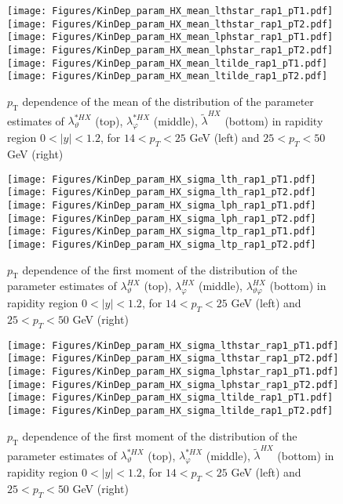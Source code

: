\documentclass[12pt]{article}
\newcommand{\pT}{p_\mathrm{T}}
\newcommand{\absy}{\left |  y \right |}
\newcommand{\lamthHX}{\lambda^{\scriptscriptstyle HX}_\vartheta}
\newcommand{\lamphHX}{\lambda^{\scriptscriptstyle HX}_\varphi}
\newcommand{\lamthphHX}{\lambda^{\scriptscriptstyle HX}_{\vartheta \varphi}}
\newcommand{\lamtildeHX}{\tilde{\lambda}^{\scriptscriptstyle HX}}
\newcommand{\lamthstarHX}{\lambda^{* \scriptscriptstyle HX}_\vartheta}
\newcommand{\lamphstarHX}{\lambda^{* \scriptscriptstyle HX}_\varphi}
\begin{document}
\begin{figure}[htbp]
\centering
\texttt{[image: Figures/KinDep\_param\_HX\_mean\_lthstar\_rap1\_pT1.pdf]}
\texttt{[image: Figures/KinDep\_param\_HX\_mean\_lthstar\_rap1\_pT2.pdf]}
\texttt{[image: Figures/KinDep\_param\_HX\_mean\_lphstar\_rap1\_pT1.pdf]}
\texttt{[image: Figures/KinDep\_param\_HX\_mean\_lphstar\_rap1\_pT2.pdf]}
\texttt{[image: Figures/KinDep\_param\_HX\_mean\_ltilde\_rap1\_pT1.pdf]}
\texttt{[image: Figures/KinDep\_param\_HX\_mean\_ltilde\_rap1\_pT2.pdf]}
\caption{$\pT$ dependence of the mean of the distribution of the parameter estimates of $\lamthstarHX$ (top), $\lamphstarHX$ (middle), $\lamtildeHX$ (bottom) in rapidity region $0<\absy<1.2$, for $14 < p_T < 25$ GeV (left) and
$25 < p_T < 50$ GeV (right)}
\end{figure}
\clearpage


\begin{figure}[htbp]
\centering
\texttt{[image: Figures/KinDep\_param\_HX\_sigma\_lth\_rap1\_pT1.pdf]}
\texttt{[image: Figures/KinDep\_param\_HX\_sigma\_lth\_rap1\_pT2.pdf]}
\texttt{[image: Figures/KinDep\_param\_HX\_sigma\_lph\_rap1\_pT1.pdf]}
\texttt{[image: Figures/KinDep\_param\_HX\_sigma\_lph\_rap1\_pT2.pdf]}
\texttt{[image: Figures/KinDep\_param\_HX\_sigma\_ltp\_rap1\_pT1.pdf]}
\texttt{[image: Figures/KinDep\_param\_HX\_sigma\_ltp\_rap1\_pT2.pdf]}
\caption{$\pT$ dependence of the first moment of the distribution of the parameter estimates of $\lamthHX$ (top), $\lamphHX$ (middle), $\lamthphHX$ (bottom) in rapidity region $0<\absy<1.2$, for $14 < p_T < 25$ GeV (left) and
$25 < p_T < 50$ GeV (right)}
\end{figure}
\clearpage

\begin{figure}[htbp]
\centering
\texttt{[image: Figures/KinDep\_param\_HX\_sigma\_lthstar\_rap1\_pT1.pdf]}
\texttt{[image: Figures/KinDep\_param\_HX\_sigma\_lthstar\_rap1\_pT2.pdf]}
\texttt{[image: Figures/KinDep\_param\_HX\_sigma\_lphstar\_rap1\_pT1.pdf]}
\texttt{[image: Figures/KinDep\_param\_HX\_sigma\_lphstar\_rap1\_pT2.pdf]}
\texttt{[image: Figures/KinDep\_param\_HX\_sigma\_ltilde\_rap1\_pT1.pdf]}
\texttt{[image: Figures/KinDep\_param\_HX\_sigma\_ltilde\_rap1\_pT2.pdf]}
\caption{$\pT$ dependence of the first moment of the distribution of the parameter estimates of $\lamthstarHX$ (top), $\lamphstarHX$ (middle), $\lamtildeHX$ (bottom) in rapidity region $0<\absy<1.2$, for $14 < p_T < 25$ GeV (left) and
$25 < p_T < 50$ GeV (right)}
\end{figure}
\clearpage
\end{document}
